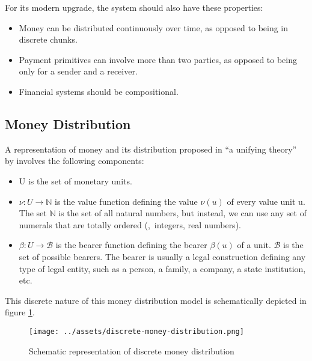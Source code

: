For its modern upgrade, the system should also have these properties:

\begin{itemize}
    \item Money can be distributed continuously over time, as opposed to being in discrete chunks.

    \item Payment primitives can involve more than two parties, as opposed to being only for a
sender and a receiver.

    \item Financial systems should be compositional.
\end{itemize}

\subsection{Money Distribution}

A representation of money and its distribution proposed in ``a unifying theory''
by \citeauthor{buldas2021unifying} involves the following components:

\begin{itemize}
    \item U is the set of monetary units.

    \item $\nu: U \rightarrow \mathbb{N}$ is the value function defining the value $\nu(u)$ of every
value unit u. The set $\mathbb{N}$ is the set of all natural numbers, but instead, we can use any
set of numerals that are totally ordered (\eg,\ integers, real numbers).

    \item $\beta: U \rightarrow \mathcal{B}$ is the bearer function defining the bearer $\beta(u)$
of a unit. $\mathcal{B}$ is the set of possible bearers. The bearer is usually a legal construction
defining any type of legal entity, such as a person, a family, a company, a state institution, etc.
\end{itemize}

This discrete nature of this money distribution model is schematically depicted
in figure \ref{fig:discrete-md}.

\begin{figure}[h]
    \centering
    \texttt{[image: ../assets/discrete-money-distribution.png]}
    \caption{Schematic representation of discrete money distribution}
    \label{fig:discrete-md}
\end{figure}

